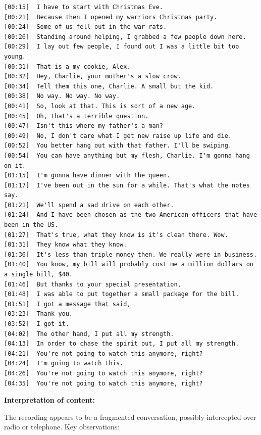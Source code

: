 \documentclass[
]{article}
\begin{document}
\begin{verbatim}
[00:15]  I have to start with Christmas Eve.
[00:21]  Because then I opened my warriors Christmas party.
[00:24]  Some of us fell out in the war rats.
[00:26]  Standing around helping, I grabbed a few people down here.
[00:29]  I lay out few people, I found out I was a little bit too young.
[00:31]  That is a my cookie, Alex.
[00:32]  Hey, Charlie, your mother's a slow crow.
[00:34]  Tell them this one, Charlie. A small but the kid.
[00:38]  No way. No way. No way.
[00:41]  So, look at that. This is sort of a new age.
[00:45]  Oh, that's a terrible question.
[00:47]  Isn't this where my father's a man?
[00:49]  No, I don't care what I get new raise up life and die.
[00:52]  You better hang out with that father. I'll be swiping.
[00:54]  You can have anything but my flesh, Charlie. I'm gonna hang on it.
[01:15]  I'm gonna have dinner with the queen.
[01:17]  I've been out in the sun for a while. That's what the notes say.
[01:21]  We'll spend a sad drive on each other.
[01:24]  And I have been chosen as the two American officers that have been in the US.
[01:27]  That's true, what they know is it's clean there. Wow.
[01:31]  They know what they know.
[01:36]  It's less than triple money then. We really were in business.
[01:40]  You know, my bill will probably cost me a million dollars on a single bill, $40.
[01:46]  But thanks to your special presentation,
[01:48]  I was able to put together a small package for the bill.
[01:51]  I got a message that said,
[03:23]  Thank you.
[03:52]  I got it.
[04:02]  The other hand, I put all my strength.
[04:13]  In order to chase the spirit out, I put all my strength.
[04:21]  You're not going to watch this anymore, right?
[04:24]  I'm going to watch this.
[04:26]  You're not going to watch this anymore, right?
[04:35]  You're not going to watch this anymore, right?
\end{verbatim}

\textbf{Interpretation of content:}

The recording appears to be a fragmented conversation, possibly
intercepted over radio or telephone. Key observations:
\end{document}
